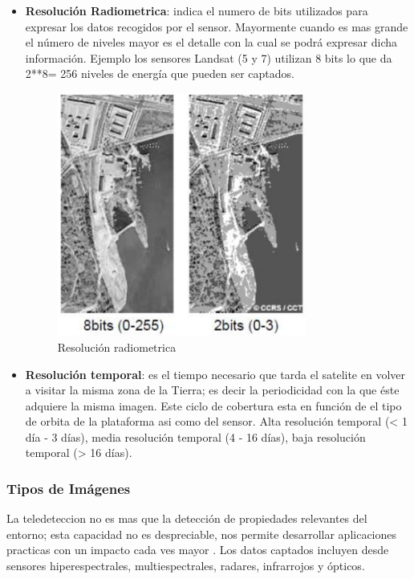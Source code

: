 \begin{itemize}
\item \textbf{Resolución Radiometrica}: indica el numero de bits utilizados para expresar los datos recogidos por el sensor. Mayormente cuando es mas grande el número de niveles mayor es el detalle con la cual se podrá expresar dicha información. Ejemplo los sensores Landsat (5 y 7) utilizan 8 bits lo que da 2**8= 256 niveles de energía que pueden ser captados.
\begin{figure}[H] \centering
  \includegraphics[height=8cm,keepaspectratio=true,clip=true]{imagenes/MarcoTeorico/resolucion_radiometrica.png}
  \caption{Resolución radiometrica}\label{Fig:resolucion-radiometrica}
\end{figure}

\item \textbf{Resolución temporal}: es el tiempo necesario que tarda el satelite en volver a visitar la misma zona de la Tierra; es decir la periodicidad con la que éste adquiere la misma imagen. Este ciclo de cobertura esta en función de el tipo de orbita de la plataforma asi como del sensor. Alta resolución temporal (< 1 día - 3 días), media resolución temporal (4 - 16 días), baja resolución temporal (> 16 días).

\end{itemize}

\subsubsection{Tipos de Imágenes}



La teledeteccion no es mas que la detección de propiedades relevantes del entorno; esta capacidad no es despreciable, nos permite desarrollar aplicaciones practicas con un impacto cada ves mayor \citep{percepcion}. Los datos captados incluyen desde sensores hiperespectrales, multiespectrales, radares, infrarrojos y ópticos.











